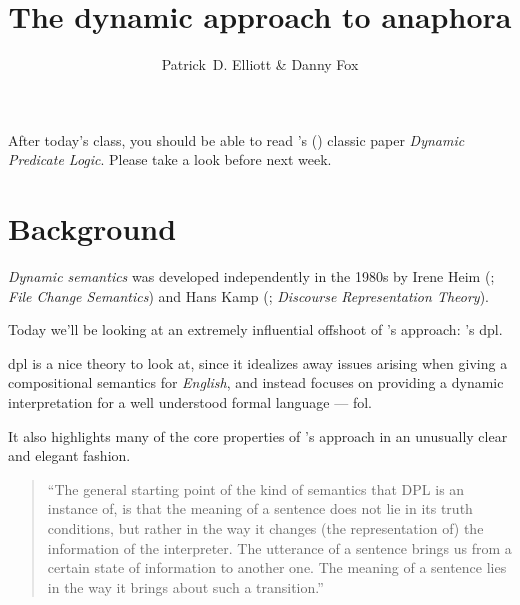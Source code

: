 \documentclass[nols,twoside,nofonts,nobib,nohyper]{tufte-handout}
\title{The dynamic approach to anaphora}
\author[Patrick D. Elliott \& Danny Fox]{Patrick~D. Elliott \& Danny Fox}
\theoremstyle{definition}
\begin{document}
\maketitle%

\begin{tcolorbox}[title=Readings]
After today's class, you should be able to read \citeauthor{GroenendijkStokhof1991}'s (\citeyear{GroenendijkStokhof1991}) classic paper \textit{Dynamic Predicate Logic}. Please take a look before next week.
\end{tcolorbox}

\section{Background}

\textit{Dynamic semantics} was developed independently in the 1980s by Irene Heim (\citeyear{Heim1982}; \textit{File Change Semantics}) and Hans Kamp (\citeyear{Kamp1981}; \textit{Discourse Representation Theory}).

Today we'll be looking at an extremely influential offshoot of \citeauthor{Heim1982}'s approach: \citeauthor{GroenendijkStokhof1991}'s \ac{dpl}.

\ac{dpl} is a nice theory to look at, since it idealizes away issues arising when giving a compositional semantics for \textit{English}, and instead focuses on providing a dynamic interpretation for a well understood formal language --- \ac{fol}.

It also highlights many of the core properties of \citeauthor{Heim1982}'s approach in an unusually clear and elegant fashion.

\begin{quotation}
\enquote{The general starting point of the kind of semantics that DPL is
an instance of, is that the meaning of a sentence does not lie in its truth conditions, but rather in the way it changes (the representation of) the information of the interpreter. The utterance
of a sentence brings us from a certain state of information to
another one. The meaning of a sentence lies in the way it brings
about such a transition.}\\
\phantom{,}\hfill\citep[p. 43]{GroenendijkStokhof1991}
\end{quotation}
\end{document}
